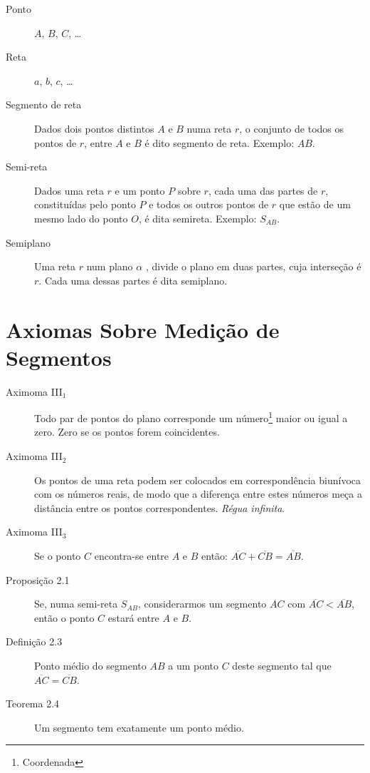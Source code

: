 \begin{description}
  \item[Ponto] $A$, $B$, $C$, \ldots

  \item[Reta] $a$, $b$, $c$, \ldots

  \item[Segmento de reta]
  Dados dois pontos distintos $A$ e $B$ numa reta $r$, o conjunto de todos os
  pontos de $r$, entre $A$ e $B$ é dito segmento de reta. Exemplo: $AB$.

  \item[Semi-reta]
  Dados uma reta $r$ e um ponto $P$ sobre $r$, cada uma das partes de $r$,
  constituídas pelo ponto $P$ e todos os outros pontos de $r$ que estão de um
  mesmo lado do ponto $O$, é dita semireta. Exemplo: $S_{AB}$.

  \item[Semiplano]
  Uma reta $r$ num plano $\alpha$ , divide o plano em duas partes, cuja
  interseção é $r$. Cada uma dessas partes é dita semiplano.
\end{description}

\section{Axiomas Sobre Medição de Segmentos}

\begin{description}
  \item[Aximoma III$_{1}$] Todo par de pontos do plano corresponde um
    número\footnote{Coordenada} maior ou igual a zero. Zero se os pontos forem
    coincidentes.

  \item[Aximoma III$_{2}$] Os pontos de uma reta podem ser colocados em
    correspondência biunívoca com os números reais, de modo que a diferença
    entre estes números meça a distância entre os pontos correspondentes.
    \emph{Régua infinita}.

  \item[Aximoma III$_{3}$] Se o ponto $C$ encontra-se entre $A$ e $B$ então:
    $\overline{AC} + \overline{CB} = \overline{AB}$.

  \item[Proposição 2.1] Se, numa semi-reta $S_{AB}$, considerarmos um segmento
    $AC$ com $\overline{AC} < \overline{AB}$, então o ponto $C$ estará entre
    $A$ e $B$.

  \item[Definição 2.3] Ponto médio do segmento $AB$ a um ponto $C$ deste
    segmento tal que $\overline{AC} = \overline{CB}$.

  \item[Teorema 2.4] Um segmento tem exatamente um ponto médio.
\end{description}

